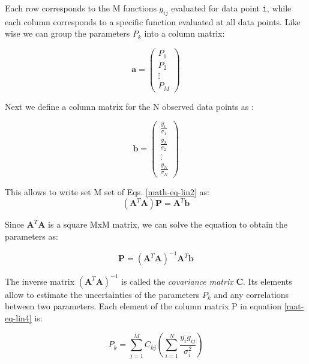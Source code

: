 Each row corresponds to the M functions $g_{ij}$ evaluated for data point
{\tt i}, while each column corresponds to a specific function evaluated
at all data points. Like wise we can group the parameters $P_{k}$ into 
a column matrix:

\begin{equation}
   \mathbf{a} = \left ( {
     \begin{array}{c} 
        P_{1} \\
        P_{2} \\
        \vdots \\
        P_{M} 
     \end{array}
   } \right )
  \label{math-eq-par}
\end{equation}

Next we define a column matrix for the N observed data points as :

\begin{equation}
   \mathbf{b} = \left ( {
     \begin{array}{c} 
        \frac{y_{1}}{\sigma_{1}} \\
        \frac{y_{2}}{\sigma_{2}} \\
        \vdots \\
        \frac{y_{N}}{\sigma_{N}} 
     \end{array}
   } \right )
  \label{math-eq-dat}
\end{equation}

This allows to write set M set of Eqs. \ref{math-eq-lin2} as:
\begin{equation}
  \left ( \mathbf{A}^{T} \mathbf{A} \right ) \mathbf{P} 
  = \mathbf{A}^{T} \mathbf{b}
  \label{mat-eq-lin3}
\end{equation}

Since $\mathbf{A}^T \mathbf{A}$ is a square MxM matrix, we can solve the 
equation to obtain the parameters as:

\begin{equation}
  \mathbf{P} = \left ( \mathbf{A}^{T} \mathbf{A} \right )^{-1}
  \mathbf{A}^{T} \mathbf{b}
  \label{mat-eq-lin4}
\end{equation}

The inverse matrix $\left ( \mathbf{A}^T \mathbf{A} \right )^{-1}$ is called the
{\it covariance matrix} {\bf C}. Its elements allow to estimate the uncertainties of
the parameters $P_{k}$ and any correlations between two parameters. 
Each element of the column matrix P in equation \ref{mat-eq-lin4} is:

\begin{equation}
  P_{k} = \sum_{j=1}^{M} C_{kj} 
  \left (
    \sum_{i=1}^{N} \frac{y_{i}g_{ij}}{\sigma_{i}^2}
  \right ) 
  \label{mat-eq-lin5}
\end{equation}

